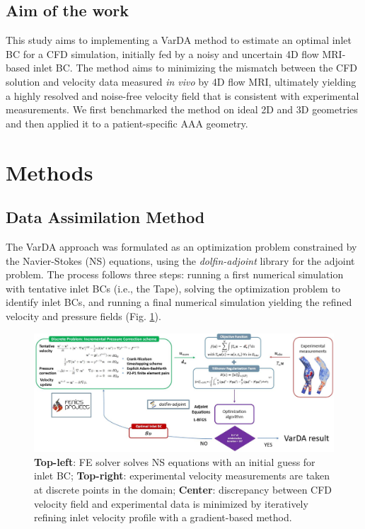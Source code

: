 \subsection*{Aim of the work}
This study aims to implementing a VarDA method to estimate an optimal inlet BC for a CFD simulation, initially fed by a noisy and uncertain 4D flow MRI-based inlet BC. The method aims to minimizing the mismatch between the CFD solution and velocity data measured \emph{ in vivo} by 4D flow MRI, ultimately yielding a highly resolved and noise-free velocity field that is consistent with experimental measurements. We first benchmarked the method on ideal 2D and 3D geometries and then applied it to a patient-specific AAA geometry. 

\section*{Methods}
\label{sec:methods}

\subsection*{Data Assimilation Method}
The VarDA approach was formulated as an optimization problem constrained by the Navier-Stokes (NS) equations, using the \emph{dolfin-adjoint} library for the adjoint problem. The process follows three steps: running a first numerical simulation with tentative inlet BCs (i.e., the Tape), solving the optimization problem to identify inlet BCs, and running a final numerical simulation yielding the refined velocity and pressure fields (Fig. \ref{fig:scheme}).

\begin{figure}
    \centering
    \includegraphics[width=\textwidth]{chapters/chp1/graphics/schema2.JPG}
    \caption{\small \textbf{Top-left}: FE solver solves NS equations with an initial guess for inlet BC; \textbf{Top-right}: experimental velocity measurements are taken at discrete points in the domain; \textbf{Center}: discrepancy between CFD velocity field and experimental data is minimized by iteratively refining inlet velocity profile with a gradient-based method.}
    \label{fig:scheme}
\end{figure}


